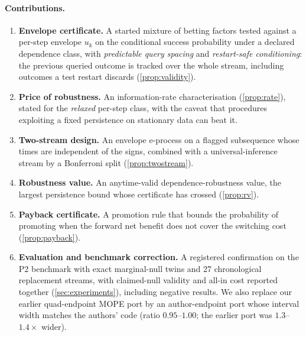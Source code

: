 \paragraph{Contributions.}
\begin{enumerate}
  \item \textbf{Envelope certificate.} A started mixture of betting factors tested against a
  per-step envelope $u_k$ on the conditional success probability under a declared dependence class,
  with \emph{predictable query spacing} and \emph{restart-safe conditioning}: the previous queried
  outcome is tracked over the whole stream, including outcomes a test restart discards
  (\cref{prop:validity}).
  \item \textbf{Price of robustness.} An information-rate characterisation (\cref{prop:rate}),
  stated for the \emph{relaxed} per-step class, with the caveat that procedures exploiting a fixed
  persistence on stationary data can beat it.
  \item \textbf{Two-stream design.} An envelope e-process on a flagged subsequence whose times are
  independent of the signs, combined with a universal-inference stream by a Bonferroni split
  (\cref{prop:twostream}).
  \item \textbf{Robustness value.} An anytime-valid dependence-robustness value, the largest
  persistence bound whose certificate has crossed (\cref{prop:rv}).
  \item \textbf{Payback certificate.} A promotion rule that bounds the probability of promoting when the
  forward net benefit does not cover the switching cost (\cref{prop:payback}).
  \item \textbf{Evaluation and benchmark correction.} A registered confirmation on the P2
  benchmark with exact marginal-null twins and 27 chronological replacement streams, with
  claimed-null validity and all-in cost reported together (\cref{sec:experiments}), including negative
  results. We also replace our earlier quad-endpoint MOPE port by an author-endpoint port whose
  interval width matches the authors' code (ratio $0.95$--$1.00$; the earlier port was $1.3$--$1.4\times$
  wider).
\end{enumerate}
